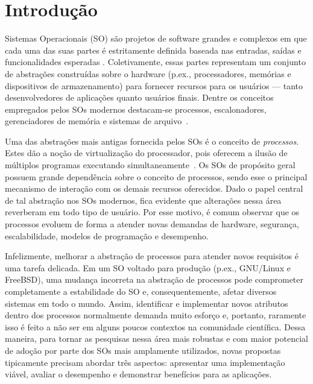 \chapter{Introdução}
\label{cap:introducao}

Sistemas Operacionais (SO) são projetos de software grandes e
complexos em que cada uma das suas partes é estritamente definida baseada nas
entradas, saídas e funcionalidades esperadas \citep{silberschatz}.
Coletivamente, essas partes representam um conjunto de abstrações construídas
sobre o hardware (p.ex., processadores, memórias e dispositivos de
armazenamento) para fornecer recursos para os usuários --- tanto
desenvolvedores de aplicações quanto usuários finais. Dentre os conceitos
empregados pelos SOs modernos destacam-se processos, escalonadores,
gerenciadores de memória e sistemas de arquivo~\citep{tanenbaum}.

Uma das abstrações mais antigas fornecida pelos SOs é o conceito de
\textit{processos}. Estes dão a noção de virtualização do processador, pois
oferecem a ilusão de múltiplos programas executando
simultaneamente~\citep{love, tanenbaum}. Os SOs de propósito geral possuem
grande dependência sobre o conceito de processos, sendo esse o principal
mecanismo de interação com os demais recursos oferecidos. Dado o papel central
de tal abstração nos SOs modernos, fica evidente que alterações nessa área
reverberam em todo tipo de usuário. Por esse motivo, é comum observar que os
processos evoluem de forma a atender novas demandas de hardware, segurança,
escalabilidade, modelos de programação e desempenho.

Infelizmente, melhorar a abstração de processos para atender novos requisitos é
uma tarefa delicada. Em um SO voltado para produção (p.ex., GNU/Linux e
FreeBSD), uma mudança incorreta na abstração de processos pode comprometer
completamente a estabilidade do SO e, consequentemente, afetar diversos sistemas em
todo o mundo. Assim, identificar e implementar novos atributos dentro dos
processos normalmente demanda muito esforço e, portanto, raramente isso é feito a não ser em alguns poucos contextos na comunidade científica. Dessa
maneira, para tornar as pesquisas nessa área mais robustas e com maior
potencial de adoção por parte dos SOs mais amplamente utilizados, novas propostas tipicamente
precisam abordar três aspectos: apresentar uma implementação viável,
avaliar o desempenho e demonstrar benefícios para as aplicações.

